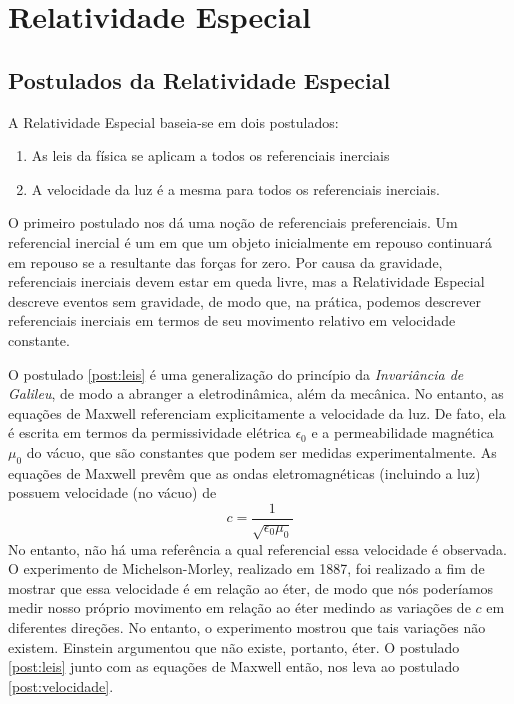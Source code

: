 \chapter{Relatividade Especial}\label{cap:RelatividadeEspecial}

\section{Postulados da Relatividade Especial}\label{sec:PostuladosRelatividadeEspecial}

A Relatividade Especial baseia-se em dois postulados:

\begin{enumerate}[label=\textbf{(\Roman*)}]
    \item As leis da física se aplicam a todos os referenciais inerciais \label{post:leis}
    \item A velocidade da luz é a mesma para todos os referenciais inerciais. \label{post:velocidade}
\end{enumerate}

O primeiro postulado nos dá uma noção de referenciais preferenciais. Um referencial inercial é um em que um objeto inicialmente em repouso continuará em repouso se a resultante das forças for zero. Por causa da gravidade, referenciais inerciais devem estar em queda livre, mas a Relatividade Especial descreve eventos sem gravidade, de modo que, na prática, podemos descrever referenciais inerciais em termos de seu movimento relativo em velocidade constante.

O postulado \ref{post:leis} é uma generalização do princípio da \textit{Invariância de Galileu}, de modo a abranger a eletrodinâmica, além da mecânica. No entanto, as equações de Maxwell referenciam explicitamente a velocidade da luz. De fato, ela é escrita em termos da permissividade elétrica $\epsilon_0$ e a permeabilidade magnética $\mu_0$ do vácuo, que são constantes que podem ser medidas experimentalmente. As equações de Maxwell prevêm que as ondas eletromagnéticas (incluindo a luz) possuem velocidade (no vácuo) de 
\[
    c = \frac{1}{\sqrt{\epsilon_0\mu_0}}
\]
No entanto, não há uma referência a qual referencial essa velocidade é observada. O experimento de Michelson-Morley, realizado em 1887, foi realizado a fim de mostrar que essa velocidade é em relação ao éter, de modo que nós poderíamos medir nosso próprio movimento em relação ao éter medindo as variações de $c$ em diferentes direções. No entanto, o experimento mostrou que tais variações não existem. Einstein argumentou que não existe, portanto, éter. O postulado \ref{post:leis} junto com as equações de Maxwell então, nos leva ao postulado \ref{post:velocidade}.

